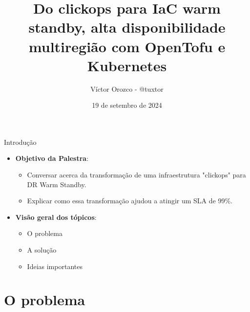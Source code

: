 \documentclass[aspectratio=169]{beamer}
\title{Do clickops para IaC warm standby, alta disponibilidade multiregião com OpenTofu e Kubernetes}
\author{Víctor Orozco - @tuxtor}
\institute{Nabenik}
\date{19 de setembro de 2024}
\begin{document}
{
    \frame{\titlepage}
}

\begin{frame}{Introdução}
	\begin{itemize}
	\item \textbf{Objetivo da Palestra}:
	\begin{itemize}
		\item Conversar acerca da transformação de uma infraestrutura  "clickops" para DR Warm Standby.
		\item Explicar como essa transformação ajudou a atingir um SLA de 99\%.
	\end{itemize}
	\item \textbf{Visão geral dos tópicos}:
	\begin{itemize}
		\item O problema
		\item A solução
		\item Ideias importantes
	\end{itemize}
\end{itemize}
\end{frame}



{
	\section{O problema}
}
\end{document}
